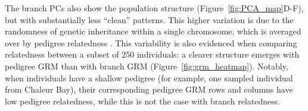 The branch PCs also show the population structure (Figure~\ref{fig:PCA_map}D-F),
but with substantially less ``clean'' patterns.
%
This higher variation is due to the randomness of genetic inheritance within a single chromosome,
which is averaged over by pedigree relatedness \citep{weir2006genetic, hill2011variation, thompson2013identity, garciacortes2013variance}.
%
This variability is also evidenced when comparing relatedness between a subset of 250 individuals: a clearer structure emerges with pedigree GRM than with branch GRM (Figure~\ref{fig:grm_heatmap}).
% 
%
%
%
%
Notably, when individuals have a shallow pedigree
(for example, one sampled individual from Chaleur Bay),
their corresponding pedigree GRM rows and columns have low pedigree relatedness,
while this is not the case with branch relatedness.

